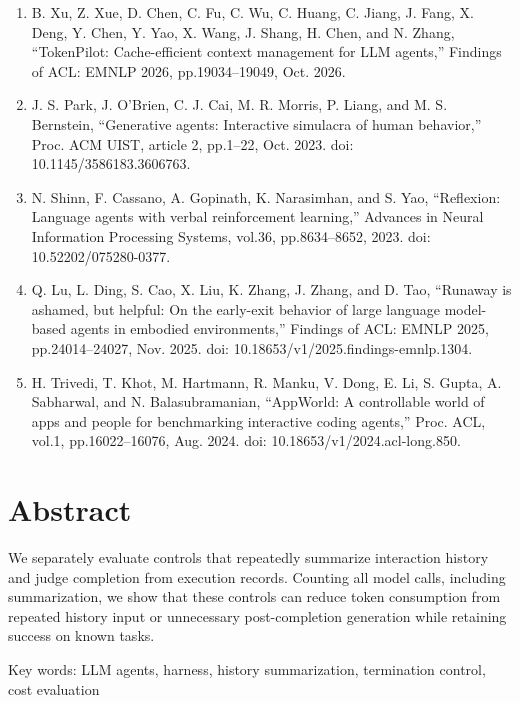 \documentclass{article}
\begin{document}
\begin{enumerate}
\item B. Xu, Z. Xue, D. Chen, C. Fu, C. Wu, C. Huang, C. Jiang, J. Fang,
X. Deng, Y. Chen, Y. Yao, X. Wang, J. Shang, H. Chen, and N. Zhang,
``TokenPilot: Cache-efficient context management for LLM agents,''
Findings of ACL: EMNLP 2026, pp.19034--19049, Oct. 2026.

\item J. S. Park, J. O'Brien, C. J. Cai, M. R. Morris, P. Liang, and M. S. Bernstein,
``Generative agents: Interactive simulacra of human behavior,''
Proc. ACM UIST, article 2, pp.1--22, Oct. 2023.
doi: 10.1145/3586183.3606763.

\item N. Shinn, F. Cassano, A. Gopinath, K. Narasimhan, and S. Yao,
``Reflexion: Language agents with verbal reinforcement learning,''
Advances in Neural Information Processing Systems, vol.36, pp.8634--8652, 2023.
doi: 10.52202/075280-0377.

\item Q. Lu, L. Ding, S. Cao, X. Liu, K. Zhang, J. Zhang, and D. Tao,
``Runaway is ashamed, but helpful: On the early-exit behavior of large language model-based agents in embodied environments,''
Findings of ACL: EMNLP 2025, pp.24014--24027, Nov. 2025.
doi: 10.18653/v1/2025.findings-emnlp.1304.

\item H. Trivedi, T. Khot, M. Hartmann, R. Manku, V. Dong, E. Li, S. Gupta,
A. Sabharwal, and N. Balasubramanian,
``AppWorld: A controllable world of apps and people for benchmarking interactive coding agents,''
Proc. ACL, vol.1, pp.16022--16076, Aug. 2024.
doi: 10.18653/v1/2024.acl-long.850.

\end{enumerate}

\section*{Abstract}
We separately evaluate controls that repeatedly summarize interaction history and judge completion from execution records. Counting all model calls, including summarization, we show that these controls can reduce token consumption from repeated history input or unnecessary post-completion generation while retaining success on known tasks.

\noindent Key words: LLM agents, harness, history summarization, termination control, cost evaluation
\end{document}
